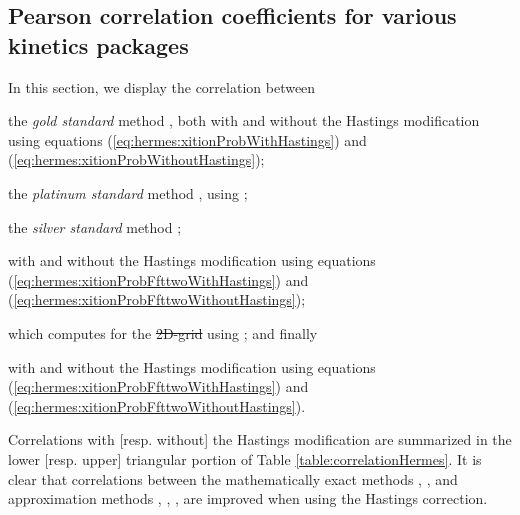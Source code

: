 \documentclass[11pt, oneside]{Thesis} %
\providecommand{\DIFadd}[1]{{\protect\color{blue}\uwave{#1}}} %
\providecommand{\DIFdel}[1]{{\protect\color{red}\sout{#1}}}                      %
\providecommand{\DIFaddbegin}{} %
\providecommand{\DIFaddend}{} %
\providecommand{\DIFdelbegin}{} %
\providecommand{\DIFdelend}{} %
\begin{document}
\subsection{Pearson correlation coefficients for various kinetics packages}
\label{subsec:hermes:corr}

In this section, we display the correlation between
\begin{inparaenum}[\em 1\upshape)]
\item the {\em gold standard} method \rnamfpt, both with and without the Hastings
modification using equations (\ref{eq:hermes:xitionProbWithHastings}) and
(\ref{eq:hermes:xitionProbWithoutHastings});
\item the {\em platinum standard} method \rnaeq, using
;
\item the {\em silver standard} method \kinfold;
\item \fftmfpt with and without the Hastings modification using equations
(\ref{eq:hermes:xitionProbFfttwoWithHastings}) and
(\ref{eq:hermes:xitionProbFfttwoWithoutHastings});
\item \ffteq which computes \eqt for the \DIFdelbegin \DIFdel{2D-grid }\DIFdelend \DIFaddbegin \twoD \DIFadd{grid }\DIFaddend using
; and finally
\item \rnatwofold with and without the Hastings modification using equations
(\ref{eq:hermes:xitionProbFfttwoWithHastings}) and
(\ref{eq:hermes:xitionProbFfttwoWithoutHastings}).
\end{inparaenum}
Correlations
with [resp. without] the Hastings modification are summarized in the
lower [resp. upper] triangular portion of
Table \ref{table:correlationHermes}. It is clear that correlations between
the mathematically exact methods \rnamfpt, \rnaeq, and
approximation methods \kinfold, \fftmfpt, \ffteq, \rnatwofold are
improved when using the Hastings correction.
\end{document}
